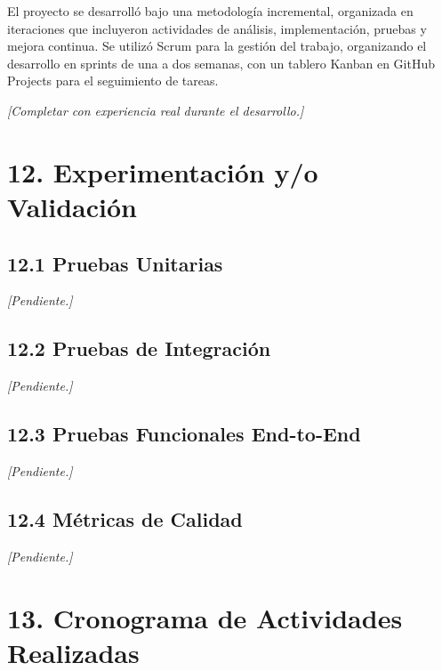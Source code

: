 \documentclass[12pt, a4paper]{report}
\begin{document}
El proyecto se desarrolló bajo una metodología incremental, organizada en iteraciones que
incluyeron actividades de análisis, implementación, pruebas y mejora continua. Se utilizó
Scrum para la gestión del trabajo, organizando el desarrollo en sprints de una a dos semanas,
con un tablero Kanban en GitHub Projects para el seguimiento de tareas.

\textit{[Completar con experiencia real durante el desarrollo.]}

\chapter*{12. Experimentación y/o Validación}

\section*{12.1 Pruebas Unitarias}

\textit{[Pendiente.]}

\section*{12.2 Pruebas de Integración}

\textit{[Pendiente.]}

\section*{12.3 Pruebas Funcionales End-to-End}

\textit{[Pendiente.]}

\section*{12.4 Métricas de Calidad}

\textit{[Pendiente.]}

\chapter*{13. Cronograma de Actividades Realizadas}
\end{document}
